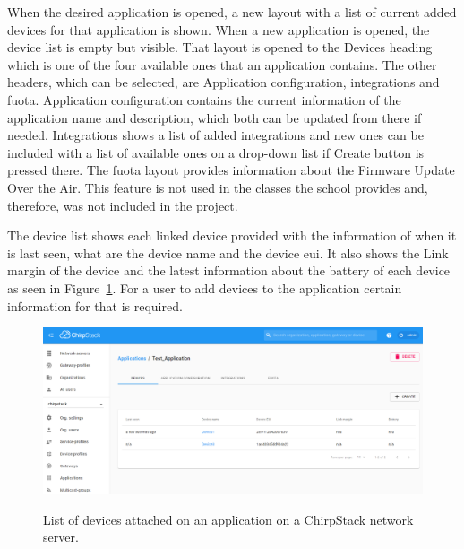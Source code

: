 When the desired application is opened, a new layout with a list of current added devices for that application is shown.
When a new application is opened, the device list is empty but visible.
That layout is opened to the Devices heading which is one of the four available ones that an application contains.
The other headers, which can be selected, are Application configuration, integrations and \gls{fuota}.
Application configuration contains the current information of the application name and description, which both can be updated from there if needed.
Integrations shows a list of added integrations and new ones can be included with a list of available ones on a drop-down list if Create button is pressed there.
The \gls{fuota} layout provides information about the Firmware Update Over the Air.
This feature is not used in the classes the school provides and, therefore, was not included in the project. 

The device list shows each linked device provided with the information of when it is last seen, what are the device name and the device \gls{eui}.
It also shows the Link margin of the device and the latest information about the battery of each device as seen in Figure~\ref{fig:ChirpStack_application}.
For a user to add devices to the application certain information for that is required.

\begin{figure}[ht]
  \centering
  {\includegraphics[width=\textwidth]{illustration/ChirpStack_application.png}}
  \caption{List of devices attached on an application on a ChirpStack network server.}
  \label{fig:ChirpStack_application}
\end{figure}

